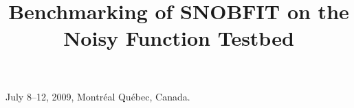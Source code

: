 \documentclass{sig-alternate}
\begin{document}
%
 {July 8--12, 2009, Montr\'eal Qu\'ebec, Canada.}

\title{Benchmarking of SNOBFIT on the Noisy Function
Testbed
}
%
%
%
%
%
\end{document}
